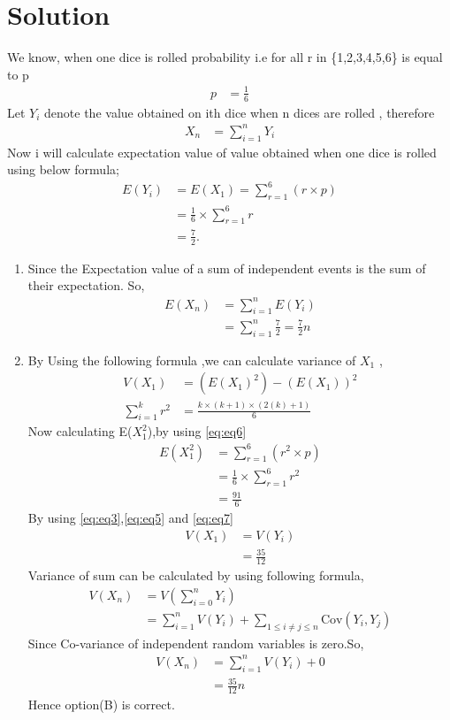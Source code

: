 \documentclass[journal,12pt,twocolumn]{IEEEtran}
\begin{document}
\section{Solution}
We know, when one dice is rolled probability i.e  for all r in \{1,2,3,4,5,6\} is equal to  p
\begin{align}
    p&=\frac{1}{6}
\end{align}
Let $Y_{i}$ denote the value obtained on ith dice when n dices are rolled  
, therefore 
\begin{align}
  X_{n}&=\sum_{i=1}^n Y_{i}
  \label{eq:eq1}
\end{align}
Now i will calculate expectation value of value obtained when one dice is rolled
using below formula;
\begin{align}
 E(Y_{i})&= E( X_{1}) =\sum_{r=1}^6 (r\times p)
 \label{eq:eq2}
\\
&=\frac{1}{6} \times \sum_{r=1}^6 r
\\
&=\frac{7}{2}.
\label{eq:eq3}
\end{align}
\begin{enumerate}
\item Since the Expectation value of a sum of independent events is the sum of their expectation. So,
\begin{align}
    E(X_{n})&=\sum_{i=1}^n E(Y_{i})
    \\
    & = \sum_{i=1}^n \frac{7}{2} =\frac{7}{2} n 
\label{eq:eq4}
\end{align}
\item By Using the following formula ,we can calculate variance of  $X_{1}$ ,
\begin{align}
    V(X_{1})&=(E(X_{1})^{2}) - (E(X_{1}))^{2}
    \label{eq:eq5}
    \\
    \sum_{i=1}^k r^2&=\frac{k\times (k+1 )\times (2(k)+1)}{6}
    \label{eq:eq6}
\end{align}
Now calculating E($X_{1}^{2}$),by using \eqref{eq:eq6}
\begin{align}
    E(X_{1}^{2})&=\sum_{r=1}^6(r^{2}\times p)
    \\
    &=\frac{1}{6}\times\sum_{r=1}^6r^{2}
    \\
    &=\frac{91}{6}
    \label{eq:eq7}
\end{align}
By using \eqref{eq:eq3},\eqref{eq:eq5} and \eqref{eq:eq7}
\begin{align}
    V(X_{1})&=V(Y_{i})
    \\
    &=\frac{35}{12}
    \label{eq:eq8}
\end{align}
Variance of sum can be calculated by using following formula,
\begin{align}
    V(X_{n})&=V(\sum_{i=0}^n Y_{i})
    \\
    &= \sum_{i=1}^n V(Y_{i}) + \sum_{1\leq i\not=j \leq n}\text{Cov}(Y_{i},Y_{j})
\end{align}
Since Co-variance of independent random variables is zero.So,
\begin{align}
    V(X_{n})&=\sum_{i=1}^n V(Y_{i}) + 0
    \\
    &=\frac{35}{12}n
\end{align}
    Hence option(B) is correct.
\end{enumerate}
\end{document}
